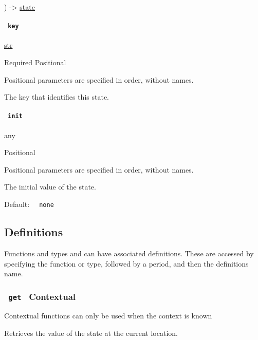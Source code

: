 ) -\textgreater{} \href{/docs/reference/introspection/state/}{state}

\paragraph{\texorpdfstring{\texttt{\ key\ }}{ key }}\label{constructor-key}

\href{/docs/reference/foundations/str/}{str}

{Required} {{ Positional }}

\label{constructor-key-positional-tooltip}
Positional parameters are specified in order, without names.

The key that identifies this state.

\paragraph{\texorpdfstring{\texttt{\ init\ }}{ init }}\label{constructor-init}

{ any }

{{ Positional }}

\label{constructor-init-positional-tooltip}
Positional parameters are specified in order, without names.

The initial value of the state.

Default: \texttt{\ }{\texttt{\ none\ }}\texttt{\ }

\subsection{\texorpdfstring{{ Definitions
}}{ Definitions }}\label{definitions}

\label{definitions-tooltip}
Functions and types and can have associated definitions. These are
accessed by specifying the function or type, followed by a period, and
then the definition\textquotesingle s name.

\subsubsection{\texorpdfstring{\texttt{\ get\ } {{ Contextual
}}}{ get   Contextual }}\label{definitions-get}

\label{definitions-get-contextual-tooltip}
Contextual functions can only be used when the context is known

Retrieves the value of the state at the current location.

